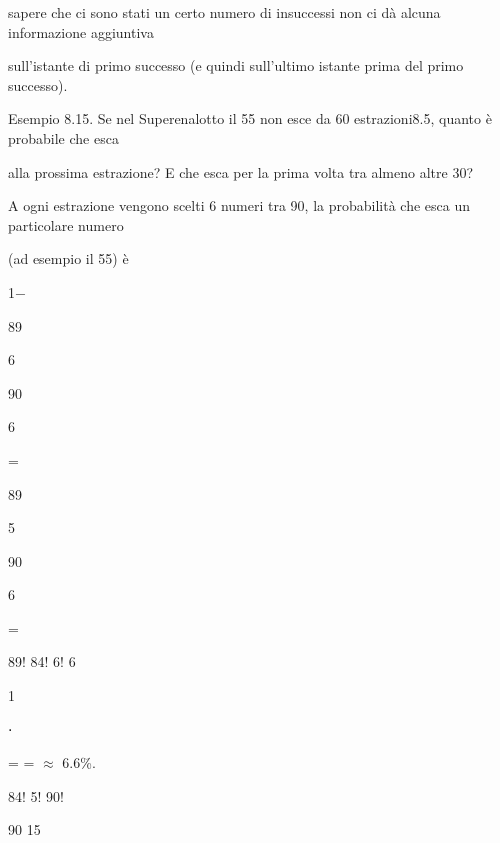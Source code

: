 \documentclass[a4paper,portrait,12pt]{article}
\begin{document}
\begin{flushleft}
sapere che ci sono stati un certo numero di insuccessi non ci d\`{a} alcuna informazione aggiuntiva
\end{flushleft}


\begin{flushleft}
sull'istante di primo successo (e quindi sull'ultimo istante prima del primo successo).
\end{flushleft}


\begin{flushleft}
Esempio 8.15. Se nel Superenalotto il 55 non esce da 60 estrazioni8.5, quanto \`{e} probabile che esca
\end{flushleft}


\begin{flushleft}
alla prossima estrazione? E che esca per la prima volta tra almeno altre 30?
\end{flushleft}


\begin{flushleft}
A ogni estrazione vengono scelti 6 numeri tra 90, la probabilit\`{a} che esca un particolare numero
\end{flushleft}


\begin{flushleft}
(ad esempio il 55) \`{e}
\end{flushleft}


1$-$





89


6


90


6





=





89


5


90


6





=





89! 84! 6! 6


1


⋅


= = $\approx$ 6.6\%.


84! 5! 90!


90 15
\end{document}
